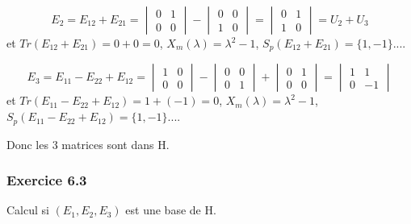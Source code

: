 \documentclass[]{book}
\theoremstyle{definition}
\begin{document}
$$
E_2 = E_{12}+E_{21} = \begin{vmatrix} 0 & 1 \\ 0 & 0 \end{vmatrix} - \begin{vmatrix} 0 & 0 \\ 1 & 0 \end{vmatrix} =  \begin{vmatrix} 0 & 1 \\ 1 & 0 \end{vmatrix} = U_2 + U_3
$$
et $Tr(E_{12}+E_{21}) = 0 + 0 = 0$, $X_m(\lambda) = \lambda^2-1$, $S_p(E_{12}+E_{21}) = \{1, -1\}$.... 

$$
E_3 = E_{11}-E_{22}+E_{12} = \begin{vmatrix} 1 & 0 \\ 0 & 0 \end{vmatrix} - \begin{vmatrix} 0 & 0 \\ 0 & 1 \end{vmatrix} + \begin{vmatrix} 0 & 1 \\ 0 & 0 \end{vmatrix} =  \begin{vmatrix} 1 & 1 \\ 0 & -1 \end{vmatrix} 
$$
et $Tr(E_{11}-E_{22}+E_{12}) = 1 + (-1) = 0$, $X_m(\lambda) = \lambda^2-1$, $S_p(E_{11}-E_{22}+E_{12}) = \{1, -1\}$.... 

Donc les 3 matrices sont dans H.

\subsubsection*{Exercice 6.3}
Calcul si $(E_1, E_2, E_3)$ est une base de H. 
\end{document}
